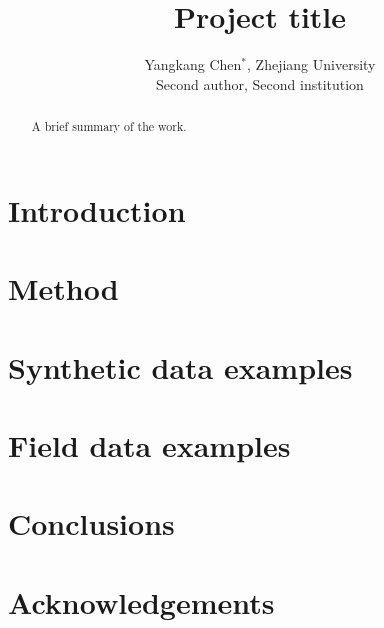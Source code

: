 \title{Project title}
\author{Yangkang Chen$^*$, Zhejiang University\\
        Second author, Second institution}
\maketitle

\begin{abstract}
A brief summary of the work.
\end{abstract}

\newpage

\section{Introduction}

\section{Method}

\section{Synthetic data examples}

\section{Field data examples}

 
\section{Conclusions}


\section{Acknowledgements}



































